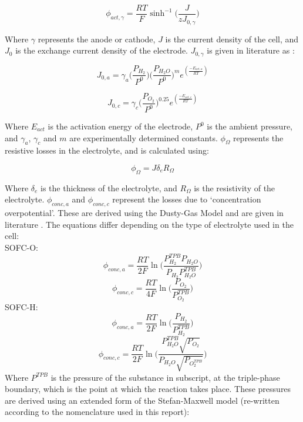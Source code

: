 \documentclass{article}
\begin{document}
\begin{equation}
\phi_{act,\gamma}=  \frac{RT}{F}   \sinh^{-1} \Big (⁡\frac{J}{zJ_{0,\gamma}} \Big )
\end{equation}

Where $\gamma$ represents the anode or cathode, $J$ is the current density of the cell, and $J_{0}$ is the exchange current density of the electrode. $J_{0,\gamma}$ is given in literature as \cite{LM4}:

\begin{equation}
J_{0,a}= \gamma_{a} \Big (\frac{P_{H_{2}}}{P^{0}}\Big ) \Big (\frac{P_{H_{2}O}}{P^{0}} \Big )^{m} e^{ (\frac{-E_{act,a}}{RT}  )}			
\end{equation}

\begin{equation}
J_{0,c}= \gamma_{c} \Big (\frac{P_{O_{2}}}{P^{0}} \Big )^{0.25} e^{(\frac{-E_{act,c}}{RT})} 					
\end{equation}

Where $E_{act}$ is the activation energy of the electrode, $P^0$ is the ambient pressure, and $\gamma_a$, $\gamma_c$ and $m$ are experimentally determined constants.
$\phi_\Omega$ represents the resistive losses in the electrolyte, and is calculated using:

\begin{equation}
\phi_{\Omega}=J\delta_{e} R_{\Omega} 						
\end{equation}

Where $\delta_e$ is the thickness of the electrolyte, and $R_\Omega$ is the resistivity of the electrolyte.
$\phi_{conc,a}$ and $\phi_{conc,c}$ represent the losses due to `concentration overpotential'. These are derived using the Dusty-Gas Model and are given in literature \cite{LM5}. The equations differ depending on the type of electrolyte used in the cell:\\
\newline
SOFC-O:	
\begin{equation}
\phi_{conc,a} = \frac{RT}{2F} \ln \Big (\frac{P_{H_{2}}^{TPB} P_{H_{2}O}}{P_{H_{2}} P_{H_{2}O}^{TPB}} \Big )
\end{equation}
\begin{equation}
\phi_{conc,c} = \frac{RT}{4F} \ln \Big (\frac{P_{O_{2}}}{P_{O_{2}}^{TPB}} \Big ) 			
\end{equation}
SOFC-H:	
\begin{equation}
\phi_{conc,a}=  \frac{RT}{2F} \ln \Big (\frac{ P_{H_{2}} }{ P_{H_{2}}^{TPB} } \Big )			
\end{equation}
\begin{equation}
\phi_{conc,c}=  \frac{RT}{2F} \ln \Big ( \frac{P_{H_{2}O}^{TPB} \sqrt{{P_{O_{2}}}}}{P_{H_{2}O} \sqrt{P_O_{2}^{TPB}}} \Big) 
\end{equation}
Where $P^{TPB}$ is the pressure of the substance in subscript, at the triple-phase boundary, which is the point at which the reaction takes place. These pressures are derived using an extended form of the Stefan-Maxwell model \cite{LM6} (re-written according to the nomenclature used in this report):
\end{document}
